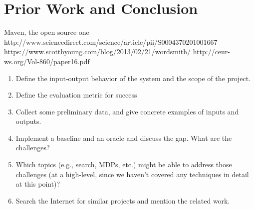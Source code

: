 \documentclass[12pt]{article}
\begin{document}
\section*{Prior Work and Conclusion}
Maven, the open source one
http://www.sciencedirect.com/science/article/pii/S0004370201001667
https://www.scotthyoung.com/blog/2013/02/21/wordsmith/
http://ceur-ws.org/Vol-860/paper16.pdf

\begin{enumerate}[label=(\roman*)]
  \item  Define the input-output behavior of the system and the scope of the project.
  \item  Define the evaluation metric for success
  \item  Collect some preliminary data, and give concrete examples of inputs and outputs.
  \item  Implement a baseline and an oracle and discuss the gap. What are the challenges?
  \item Which topics (e.g., search, MDPs, etc.) might be able to address those challenges (at a high-level, since we haven't covered any techniques in detail at this point)?
  \item  Search the Internet for similar projects and mention the related work.
\end{enumerate}
\end{document}
